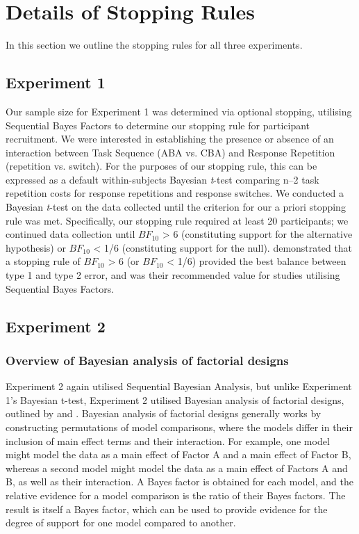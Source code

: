 \documentclass[a4paper, doc, natbib]{apa6}
\begin{document}
 





\newpage
\appendix
\section{Details of Stopping Rules}
In this section we outline the stopping rules for all three experiments. 

\subsection{Experiment 1}
Our sample size for Experiment 1 was determined via optional stopping, utilising Sequential Bayes Factors \citep{Schoenbrodtinpress} to determine our stopping rule for participant recruitment. We were interested in establishing the presence or absence of an interaction between Task Sequence (ABA vs. CBA) and Response Repetition (repetition vs. switch). For the purposes of our stopping rule, this can be expressed as a default within-subjects Bayesian \emph{t}-test \citep{Rouder2009} comparing n--2 task repetition costs for response repetitions and response switches.  We conducted a Bayesian \emph{t}-test on the data collected until the criterion for our a priori stopping rule was met. Specifically, our stopping rule required at least 20 participants; we continued data collection until $BF_{10}$ > 6 (constituting support for the alternative hypothesis) or $BF_{10}$ < 1/6 (constituting support for the null). \cite{Schoenbrodtinpress} demonstrated that a stopping rule of $BF_{10}$ > 6 (or $BF_{10}$ < 1/6) provided the best balance between type 1 and type 2 error, and was their recommended value for studies utilising Sequential Bayes Factors. 

\subsection{Experiment 2}
\subsubsection{Overview of Bayesian analysis of factorial designs}
Experiment 2 again utilised Sequential Bayesian Analysis, but unlike Experiment 1's Bayesian t-test, Experiment 2 utilised Bayesian analysis of factorial designs, outlined by \cite{Rouderinpress} and \cite{Morey2015}. Bayesian analysis of factorial designs generally works by constructing permutations of model comparisons, where the models differ in their inclusion of main effect terms and their interaction. For example, one model might model the data as a main effect of Factor A and a main effect of Factor B, whereas a second model might model the data as a main effect of Factors A and B, as well as their interaction. A Bayes factor is obtained for each model, and the relative evidence for a model comparison is the ratio of their Bayes factors. The result is itself a Bayes factor, which can be used to provide evidence for the degree of support for one model compared to another.
\end{document}
